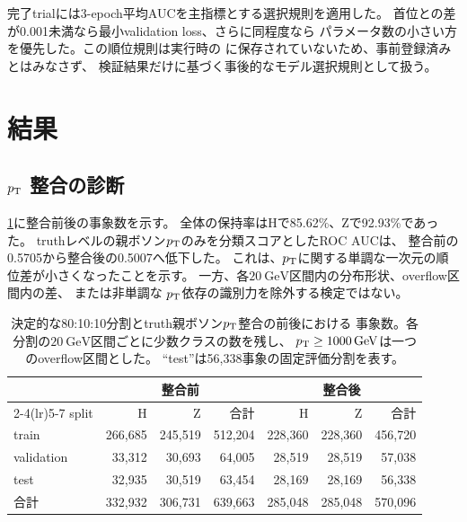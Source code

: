 \documentclass[xelatex,ja=standard,a4paper,10pt,twocolumn]{bxjsarticle}
\begin{document}
完了trialには3-epoch平均AUCを主指標とする選択規則を適用した。
首位との差が0.001未満なら最小validation loss、さらに同程度なら
パラメータ数の小さい方を優先した。この順位規則は実行時の
に保存されていないため、事前登録済みとはみなさず、
検証結果だけに基づく事後的なモデル選択規則として扱う。

\section{結果}
\label{sec:results}

\subsection{\(p_{\mathrm{T}}\) 整合の診断}
\label{subsec:matching_result}

\cref{tab:split_counts}に整合前後の事象数を示す。
全体の保持率はHで85.62\%、Zで92.93\%であった。
truthレベルの親ボソン\(p_{\mathrm{T}}\)のみを分類スコアとしたROC AUCは、
整合前の0.5705から整合後の0.5007へ低下した。
これは、\(p_{\mathrm{T}}\)に関する単調な一次元の順位差が小さくなったことを示す。
一方、各\(\SI{20}{\GeV}\)区間内の分布形状、overflow区間内の差、
または非単調な
\(p_{\mathrm{T}}\)依存の識別力を除外する検定ではない。

\begin{table}[t]
  \centering
  \caption{決定的な80:10:10分割とtruth親ボソン\(p_{\mathrm{T}}\)整合の前後における
    事象数。各分割の\(\SI{20}{\GeV}\)区間ごとに少数クラスの数を残し、
    \(\pt\geq\SI{1000}{\GeV}\)は一つのoverflow区間とした。
    ``test''は56,338事象の固定評価分割を表す。}
  \label{tab:split_counts}
  \begin{tabular}{lrrrrrr}
    \toprule
    & \multicolumn{3}{c}{整合前} & \multicolumn{3}{c}{整合後} \\
    \cmidrule(lr){2-4}\cmidrule(lr){5-7}
    split & H & Z & 合計 & H & Z & 合計 \\
    \midrule
    train      & 266,685 & 245,519 & 512,204 & 228,360 & 228,360 & 456,720 \\
    validation &  33,312 &  30,693 &  64,005 &  28,519 &  28,519 &  57,038 \\
    test       &  32,935 &  30,519 &  63,454 &  28,169 &  28,169 &  56,338 \\
    \midrule
    合計       & 332,932 & 306,731 & 639,663 & 285,048 & 285,048 & 570,096 \\
    \bottomrule
  \end{tabular}
\end{table}
\end{document}
